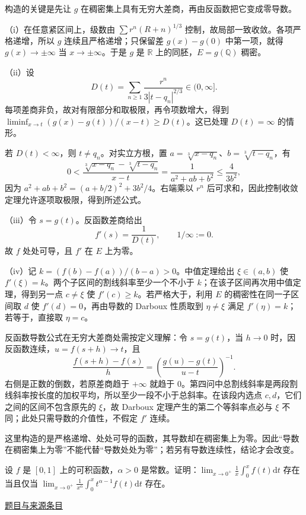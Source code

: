 \documentclass[UTF8,12pt,a4paper,fontset=fandol]{ctexart}
\begin{document}
\begin{solve}\label{ans:fin14-high:7}

构造的关键是先让 $g$ 在稠密集上具有无穷大差商，再由反函数把它变成零导数。

（i）在任意紧区间上，级数由 $\sum r^n(R+n)^{1/3}$ 控制，故局部一致收敛。各项严格递增，所以 $g$ 连续且严格递增；只保留差 $g(x)-g(0)$ 中第一项，就得 $g(x)\to\pm\infty$ 当 $x\to\pm\infty$。于是 $g$ 是 $\mathbb R$ 上的同胚，$E=g(\mathbb Q)$ 稠密。

（ii）设
\[
D(t)=\sum_{n\ge1}\frac{r^n}{3|t-q_n|^{2/3}}\in(0,\infty].
\]
每项差商非负，故对有限部分和取极限，再令项数增大，得到 $\liminf_{x\to t}(g(x)-g(t))/(x-t)\ge D(t)$。这已处理 $D(t)=\infty$ 的情形。

若 $D(t)<\infty$，则 $t\ne q_n$。对实立方根，置 $a=\sqrt[3]{x-q_n}$、$b=\sqrt[3]{t-q_n}$，有
\[
0<\frac{\sqrt[3]{x-q_n}-\sqrt[3]{t-q_n}}{x-t}
=\frac1{a^2+ab+b^2}\le\frac4{3b^2},
\]
因为 $a^2+ab+b^2=(a+b/2)^2+3b^2/4$。右端乘以 $r^n$ 后可求和，因此控制收敛定理允许逐项取极限，得到所述公式。

（iii）令 $s=g(t)$。反函数差商给出
\[
f'(s)=\frac1{D(t)},\qquad 1/\infty:=0.
\]
故 $f$ 处处可导，且 $f'$ 在 $E$ 上为零。

（iv）记 $k=(f(b)-f(a))/(b-a)>0$。中值定理给出 $\xi\in(a,b)$ 使 $f'(\xi)=k$。两个子区间的割线斜率至少一个不小于 $k$；在该子区间再次用中值定理，得到另一点 $c\ne\xi$ 使 $f'(c)\ge k$。若严格大于，利用 $E$ 的稠密性在同一子区间取 $d$ 使 $f'(d)=0$，再由导数的 Darboux 性质取到 $\eta\ne\xi$ 满足 $f'(\eta)=k$；若等于，直接取 $\eta=c$。

反函数导数公式在无穷大差商处需按定义理解：令 $s=g(t)$，当 $h\to0$ 时，因反函数连续，$u=f(s+h)\to t$，且
\[
\frac{f(s+h)-f(s)}h=\left(\frac{g(u)-g(t)}{u-t}\right)^{-1}.
\]
右侧是正数的倒数，若原差商趋于 $+\infty$ 就趋于 $0$。第四问中总割线斜率是两段割线斜率按长度的加权平均，所以至少一段不小于总斜率。在该段内选点 $c,d$，它们之间的区间不包含原先的 $\xi$，故 Darboux 定理产生的第二个等斜率点必与 $\xi$ 不同；此处只需导数的介值性，不假定 $f'$ 连续。

\end{solve}

\begin{remark}[方法与条件]这里构造的是严格递增、处处可导的函数，其导数却在稠密集上为零。因此“导数在稠密集上为零”不能代替“导数处处为零”；若另有导数连续性，结论才会改变。\end{remark}

\begin{example}\label{ex:fin14-low:9}\label{pr:fin14-low:9}

设 $f$ 是 $[0, 1]$ 上的可积函数，$\alpha > 0$ 是常数。证明：$\lim_{x \to 0^+} \frac{1}{x} \int_0^x f(t) \mathrm{d}t$ 存在当且仅当 $\lim_{x \to 0^+} \frac{1}{x^\alpha} \int_0^x t^{\alpha-1} f(t) \mathrm{d}t$ 存在。

\par\href{https://github.com/lzxcr/cmc-mathematics/blob/64916fa1fdbc3e444a652eca204d5669058ee321/src/problems/finals/14/10.md}{题目与来源条目}

\end{example}
\end{document}
